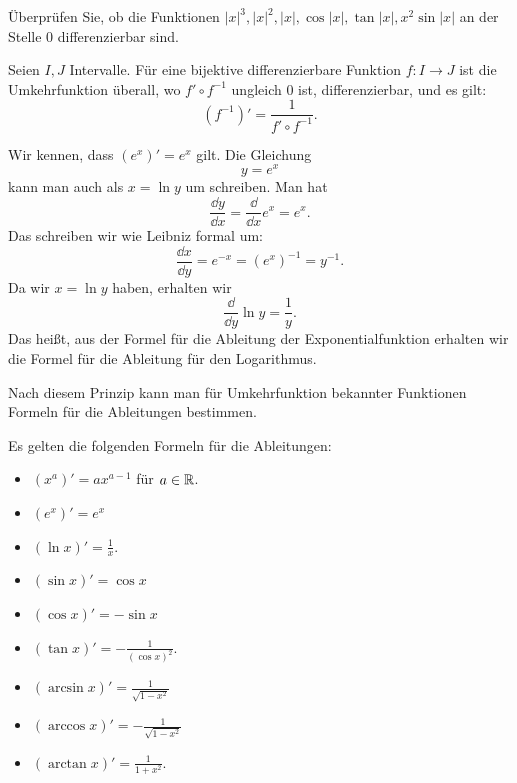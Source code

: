 \begin{aufg}
	Überprüfen Sie, ob die Funktionen $|x|^3, |x|^2, |x|, \cos|x|, \tan |x|, x^2 \sin |x|$ an der Stelle $0$ differenzierbar sind. 
\end{aufg} 

\begin{thm} 
	Seien $I, J$ Intervalle. Für eine bijektive differenzierbare Funktion $ f : I \to J$ ist die Umkehrfunktion überall, wo $f' \circ f^{-1}$ ungleich $0$ ist, differenzierbar, und es gilt: 
	\[
		(f^{-1})' = \frac{1}{f' \circ f^{-1}}. 
	\]
\end{thm} 

\begin{bsp}
	Wir kennen, dass $(e^x)' = e^x$ gilt. 
	Die Gleichung 
	\[
		y = e^x
	\]
	kann man auch als $x = \ln y$ um schreiben. Man hat 
	\[
		\frac{\dd y}{\dd x} = \frac{\dd}{\dd x} e^x = e^x. 
	\]
	Das schreiben wir wie Leibniz formal um: 
	\[
		\frac{\dd x}{\dd y} = e^{-x} = (e^x)^{-1} = y^{-1}. 
	\]
	Da wir $x = \ln y$ haben, erhalten wir 
	\[
		\frac{\dd }{\dd y}  \ln y  = \frac{1}{y}. 
	\]
	Das heißt, aus der Formel für die Ableitung der Exponentialfunktion erhalten wir die Formel für die Ableitung für den Logarithmus. 
	
	Nach diesem Prinzip kann man für Umkehrfunktion bekannter Funktionen Formeln für die Ableitungen bestimmen. 
\end{bsp} 





\begin{thm} Es gelten die folgenden Formeln für die Ableitungen: 
	\begin{itemize}
		\item[] $(x^a)' = a x^{a-1}$ für $a \in \mathbb{R}$. 
		\item[] $(e^x)'  = e^x$
		\item[] $(\ln x)' = \frac{1}{x}$. 
		\item[] $(\sin x)' = \cos x$
		\item[] $(\cos x)' = - \sin x$
		\item[] $(\tan x)' = - \frac{1}{(\cos x)^2}$. 
		\item[] $(\arcsin x)' = \frac{1}{\sqrt{1-x^2}}$
		\item[] $(\arccos x)' = - \frac{1}{\sqrt{1-x^2}}$
		\item[] $(\arctan x)' = \frac{1}{1+x^2}$. 
	\end{itemize} 
\end{thm} 

